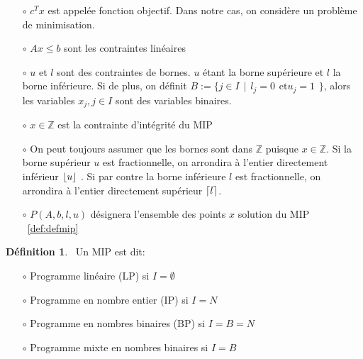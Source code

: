 \documentclass[12pt,a4paper,oneside]{book}
\theoremstyle{definition}
\newtheorem{definition}{Définition}[section]
\newcommand{\Z}{\mathbb{Z}}
\DeclarePairedDelimiter\ceil{\lceil}{\rceil}
\DeclarePairedDelimiter\floor{\lfloor}{\rfloor}
\begin{document}
	\begin{itemize}
		\item[$\circ$] $c^T x$ est appelée fonction objectif. Dans notre cas, on considère un problème de minimisation.
		\item[$\circ$] $A x \leq b$ sont les contraintes linéaires 
		\item[$\circ$] $u$ et $l$ sont des contraintes de bornes.  $u$ étant la borne supérieure et $l$ la borne inférieure. Si de plus, on définit $B := \{j \in I \hspace{5pt}|\hspace{5pt} l_j = 0 \hspace{5pt} \text{et} u_j = 1 \hspace{5pt} \}$, alors les variables $x_j, j \in I$ sont des variables binaires.
		\item[$\circ$] $x \in \Z  $ est la contrainte d'intégrité du MIP
		\item[$\circ$] On peut toujours assumer que les bornes sont dans $\Z$ puisque $x \in \Z $. Si la borne supérieur $u$ est fractionnelle, on arrondira à l’entier directement inférieur $\floor{u}$ . Si par contre la borne inférieure $l$ est fractionnelle, on arrondira à l’entier directement supérieur $\ceil{l}$. 
		\item[$\circ$] $P(A,b,l,u)$ désignera l'ensemble des points $x$ solution du MIP  ~\ref{def:defmip}
	\end{itemize}

	\begin{definition} \
			Un MIP est dit:\\
			\begin{itemize}
				\item[$\circ$] Programme linéaire (LP) si $I = \emptyset$
				\item[$\circ$] Programme  en nombre entier (IP) si $ I = N $
				\item[$\circ$] Programme en nombres binaires (BP) si $ I = B = N $
				\item[$\circ$] Programme mixte en nombres binaires si $ I = B $
				
			\end{itemize}
	\end{definition}
	
\end{document}
